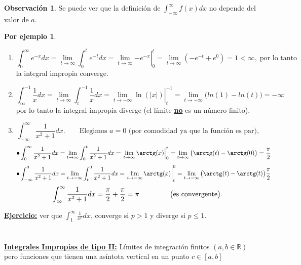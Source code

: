 \documentclass{article}
\theoremstyle{definition}
\theoremstyle{definition}
\newtheorem*{obs}{Observación}
\newtheorem*{ej}{Por ejemplo}
\theoremstyle{remark}
\newcommand\R{\ensuremath{\mathbb{R}}}
\newcommand\infi{\infty}
\begin{document}
\begin{obs}
  Se puede ver que la definición de $\int_{-\infi}^{\infi}{f(x)dx}$ no depende del valor de $a$.
\end{obs}
\begin{ej} \; \\
\begin{enumerate}
  \item \[\int_{0}^{\infi}{e^{-x}dx}
  =
  \lim_{t\to \infi}{\int_{0}^{t}{e^{-t}dx}}
  =
  \left.    \lim_{t\to \infi}{-e^{-x}}    \right\vert_0^t
  =
  \lim_{t \to \infi }{\left(-e^{-t}+e^0\right)}
  =
  1<\infi, \; \text{por lo tanto}
  \]
  la integral impropia converge.
  \item \[
\int_{\infi}^{-1}{\frac{1}{x}dx}
=
\lim_{t\to \infi}{\int_{t}^{-1}{\frac{1}{x}dx}}
=
\left.    \lim_{t  \to -\infi}{\ln{(|x|)}} \right\vert_t^{-1}
=
\lim_{t \to -\infi}{\big(ln(1)-ln(t)\big)}
=
-\infi
\]
por lo tanto la integral impropia diverge (el límite \underline{\textbf{no}} es un número finito).
\item \[
\int_{-\infi}^{\infi}{\frac{1}{x^2+1}dx}.\quad\quad \text{Elegimos $a=0$ (por comodidad ya que la función es par),} \]
\[
 \bullet \int_{0}^{\infi}{\frac{1}{x^2+1}dx}
=
\lim_{t \to \infi}{\int_{0}^{t}{\frac{1}{x^2+1}dx}}
=
\left.\lim_{t \to \infi}{\arctg (x)}\right\vert_0^t
=
\lim_{t \to \infi}{\big(\arctg(t)-\arctg(0)\big)}
=
\frac{\pi}{2}
\]
\[
\bullet \int_{-\infi}^{0}{\frac{1}{x^2+1}dx}
=
\lim_{t \to -\infi}{\int_{t}^{0}{\frac{1}{x^2+1}dx}
=
\left.\lim_{t \to -\infi }{\arctg(x)}\right\vert_t^0
=
\lim_{t \to -\infi}{\big(\arctg(t)-\arctg(t)\big)}
\frac{\pi}{2}}
\]
\[
\int_{\infi}^{\infi}{\frac{1}{x^2+1}dx}
=
\frac{\pi}{2}+\frac{\pi}{2}
=
\pi\quad\quad\quad\quad\text{ \big(es convergente\big)}.
\]
\end{enumerate}
\end{ej}
\textbf{\underline{Ejercicio:}} ver que $\int_{1}^{\infi}{\frac{1}{x^p}dx}$, converge si $p>1$ y diverge si $p\leq 1$.\\
\\\\
\textbf{\underline{Integrales Impropias de tipo II:}} Límites de integración finitos $(a,b \in \R)$ pero funciones que tienen una asíntota vertical en un punto $c \in [a,b]$
\end{document}
